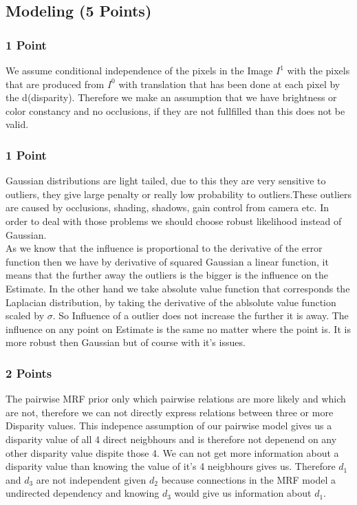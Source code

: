 \newif\ifvimbug
\vimbugfalse

\ifvimbug

\fi


\subsection{Modeling (5 Points)}
\subsubsection{1 Point}
We assume conditional independence of the pixels in the Image $I^1$ with the pixels that are produced from  $I^0$ with translation that has been done at each pixel by the d(disparity). Therefore we  make an assumption that we have brightness or color constancy and no occlusions, if they are not fullfilled than this does not be valid.
\subsubsection{1 Point}
Gaussian distributions are light tailed, due to this they are very sensitive to outliers, they give large penalty or really low probability to outliers.These outliers are caused by occlusions, shading, shadows, gain control from camera etc. In order to deal with those problems we should choose robust likelihood instead of Gaussian.\\
As we know that the influence is proportional to the derivative of the error function then we have by derivative of squared Gaussian a linear function, it means that the further away the outliers is the bigger is the influence on the Estimate. In the other hand we take absolute value function that corresponds the Laplacian distribution, by taking the derivative of  the ablsolute value function scaled by $\sigma$. So Influence of a outlier does not increase the further it is away. The influence on any point on Estimate is the same no matter where the point is. It is more robust then Gaussian but of course with it's issues.
\subsubsection{2 Points}
The pairwise MRF prior only which pairwise relations are more likely and which are not, therefore we can not directly express relations between three or more Disparity values. This indepence assumption of our pairwise model gives us a disparity value of all 4 direct neigbhours and is therefore not depenend on any other disparity value dispite those 4. We can not get more information about a disparity value than knowing the value of it's 4 neigbhours gives us. Therefore $d_1$ and $d_3$ are not independent given $d_2$ because connections in the MRF model a undirected dependency and knowing $d_3$ would give us information about $d_1$.
